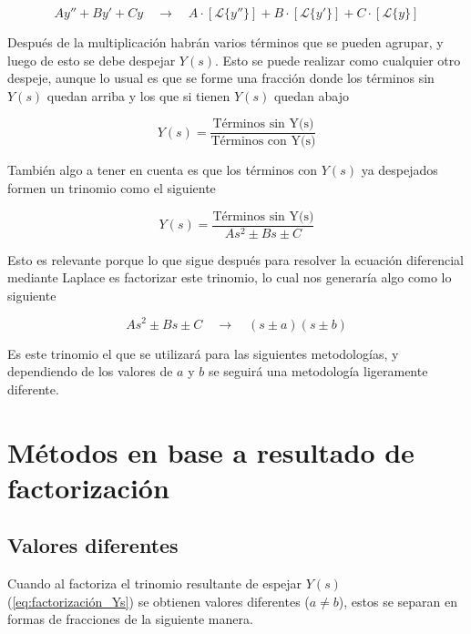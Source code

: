 \begin{equation*}
    Ay'' + By' + Cy \quad \longrightarrow \quad A \cdot [\mathcal{L}\{y''\}] + B \cdot [\mathcal{L}\{y'\}] + C \cdot [\mathcal{L}\{y\}]
\end{equation*}

Después de la multiplicación habrán varios términos que se pueden agrupar, y luego de esto se debe despejar $Y(s)$. Esto se puede realizar como cualquier otro despeje, aunque lo usual es que se forme una fracción donde los términos sin $Y(s)$ quedan arriba y los que si tienen $Y(s)$ quedan abajo

\begin{equation*}
    Y(s) = \frac{\text{Términos sin Y(s)}}{\text{Términos con Y(s)}}
\end{equation*}

También algo a tener en cuenta es que los términos con $Y(s)$ ya despejados formen un trinomio como el siguiente

\begin{equation*}
    Y(s) = \frac{\text{Términos sin Y(s)}}{As^{2} \pm Bs \pm C}
\end{equation*}

Esto es relevante porque lo que sigue después para resolver la ecuación diferencial mediante Laplace es factorizar este trinomio, lo cual nos generaría algo como lo siguiente

\begin{equation}\label{eq:factorización_Ys}
    As^{2} \pm Bs \pm C \quad \longrightarrow \quad (s \pm a)(s \pm b)
\end{equation}

Es este trinomio el que se utilizará para las siguientes metodologías, y dependiendo de los valores de $a$ y $b$ se seguirá una metodología ligeramente diferente.

\section{Métodos en base a resultado de factorización}

\subsection{Valores diferentes}

Cuando al factoriza el trinomio resultante de espejar $Y(s)$ (\autoref{eq:factorización_Ys}) se obtienen valores diferentes ($a \neq b$), estos se separan en formas de fracciones de la siguiente manera.

